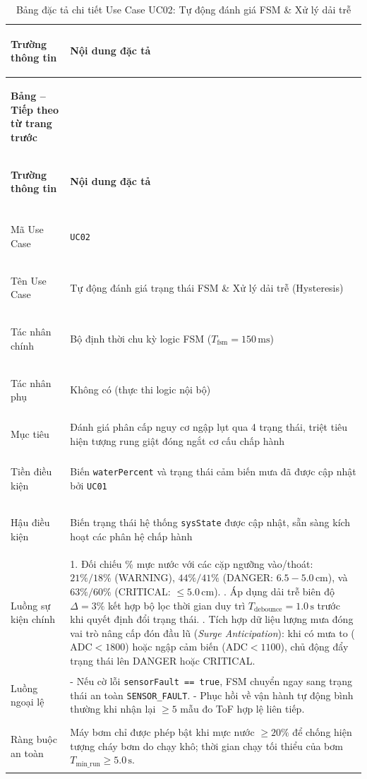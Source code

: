 \begingroup
\small
\renewcommand{\arraystretch}{1.2}
\begin{xltabular}{\textwidth}{|>{\bfseries\raggedright\arraybackslash}p{3.2cm}|X|}
\caption{Bảng đặc tả chi tiết Use Case UC02: Tự động đánh giá FSM \& Xử lý dải trễ} \label{tab:spec_uc02} \\
\hline
\textbf{Trường thông tin} & \textbf{Nội dung đặc tả} \\ \hline
\endfirsthead

{{\bfseries Bảng \thetable{} -- Tiếp theo từ trang trước}} \\
\hline
\textbf{Trường thông tin} & \textbf{Nội dung đặc tả} \\ \hline
\endhead

\hline {} \\ \hline
\endfoot

\hline
\endlastfoot
Mã Use Case & \texttt{UC02} \\ \hline
Tên Use Case & Tự động đánh giá trạng thái FSM \& Xử lý dải trễ (Hysteresis) \\ \hline
Tác nhân chính & Bộ định thời chu kỳ logic FSM ($T_{\text{fsm}} = 150\,\text{ms}$) \\ \hline
Tác nhân phụ & Không có (thực thi logic nội bộ) \\ \hline
Mục tiêu & Đánh giá phân cấp nguy cơ ngập lụt qua 4 trạng thái, triệt tiêu hiện tượng rung giật đóng ngắt cơ cấu chấp hành \\ \hline
Tiền điều kiện & Biến \texttt{waterPercent} và trạng thái cảm biến mưa đã được cập nhật bởi \texttt{UC01} \\ \hline
Hậu điều kiện & Biến trạng thái hệ thống \texttt{sysState} được cập nhật, sẵn sàng kích hoạt các phân hệ chấp hành \\ \hline
Luồng sự kiện chính & 
1. Đối chiếu \% mực nước với các cặp ngưỡng vào/thoát: $21\%/18\%$ (WARNING), $44\%/41\%$ (DANGER: $6.5 - 5.0\,\text{cm}$), và $63\%/60\%$ (CRITICAL: $\le 5.0\,\text{cm}$). . Áp dụng dải trễ biên độ $\Delta = 3\%$ kết hợp bộ lọc thời gian duy trì $T_{\text{debounce}} = 1.0\,\text{s}$ trước khi quyết định đổi trạng thái. . Tích hợp dữ liệu lượng mưa đóng vai trò nâng cấp đón đầu lũ (\textit{Surge Anticipation}): khi có mưa to ($\text{ADC} < 1800$) hoặc ngập cảm biến ($\text{ADC} < 1100$), chủ động đẩy trạng thái lên DANGER hoặc CRITICAL. \\ \hline
Luồng ngoại lệ & 
- Nếu cờ lỗi \texttt{sensorFault == true}, FSM chuyển ngay sang trạng thái an toàn \texttt{SENSOR\_FAULT}. \newline
- Phục hồi về vận hành tự động bình thường khi nhận lại $\ge 5$ mẫu đo ToF hợp lệ liên tiếp. \\ \hline
Ràng buộc an toàn & Máy bơm chỉ được phép bật khi mực nước $\ge 20\%$ để chống hiện tượng cháy bơm do chạy khô; thời gian chạy tối thiểu của bơm $T_{\text{min\_run}} \ge 5.0\,\text{s}$. \\ \hline

\end{xltabular}
\endgroup

